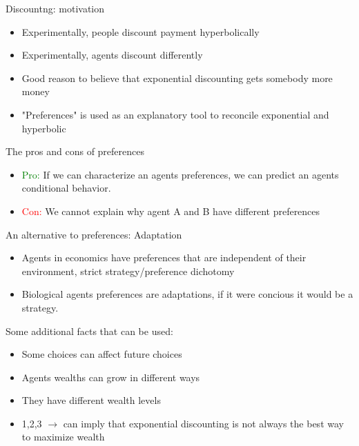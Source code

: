 \documentclass{beamer}
\newcommand{\flabel}[1]{\label{fig:#1}}
\numberwithin{equation}{section}
\begin{document}
\begin{frame}{Discountng: motivation}
\begin{itemize}
    \item Experimentally, people discount payment hyperbolically
    \item Experimentally, agents discount differently   
    \item Good reason to believe that exponential discounting gets somebody more money
    \item "Preferences" is used as an explanatory tool to reconcile exponential and hyperbolic
\end{itemize}
\end{frame}
\begin{frame}{The pros and cons of preferences}
\begin{itemize}
    \item \textcolor{green}{Pro:} If we can characterize an agents preferences, we can predict an agents conditional behavior. 
    \item \textcolor{red}{Con:} We cannot explain why agent A and B have different preferences
\end{itemize}
\end{frame}
\begin{frame}{An alternative to preferences: Adaptation}
\begin{itemize}
    \item Agents in economics have preferences that are independent of their environment, strict strategy/preference dichotomy
    \item Biological agents preferences are adaptations, if it were concious it would be a strategy. 
\end{itemize}
\end{frame}
\begin{frame}{Some additional facts that can be used:}
\begin{itemize}
    \item Some choices can affect future choices
    \item Agents wealths can grow in different ways
    \item They have different wealth levels
    \item 1,2,3 $\rightarrow$ can imply that exponential discounting is not always the best way to maximize wealth
\end{itemize}
\end{frame}
\end{document}
